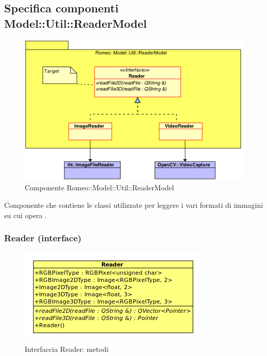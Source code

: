 \color{black}
\subsection{Specifica componenti Model::Util::ReaderModel}
\label{specificaReaderModel}
\begin{figure}[!h]
\centering
\includegraphics[scale=0.8]{../Specifica_Tecnica/Content/Immagini/Romeo__Model__Util__ReaderModel.png}
			\caption{Componente Romeo::Model::Util::ReaderModel}
			\label{comp_romeo::model::util::readermodel}
\end{figure}
Componente che contiene le classi utilizzate per leggere i vari formati di immagini su cui opera \project.

\subsubsection{Reader (interface)}
\label{spereader}
\begin{figure}[!h]
\centering
			\includegraphics[scale=1]{./Content/Immagini/model/Reader.png}
			\caption{Interfaccia Reader: metodi}
			\label{cl_reader}
\end{figure}
